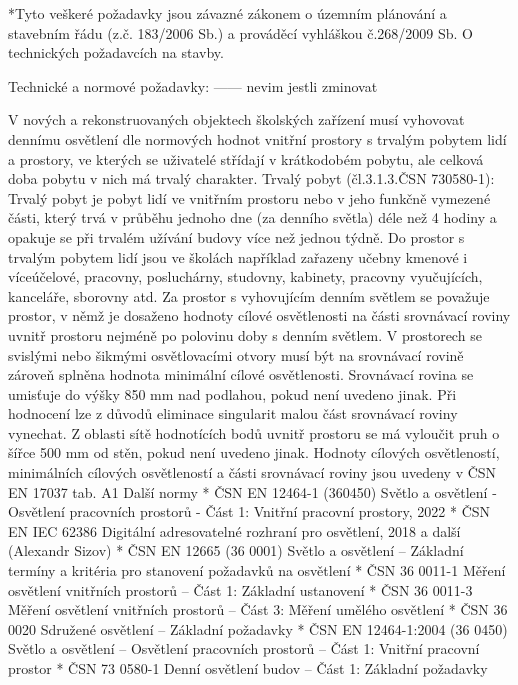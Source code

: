 *Tyto veškeré požadavky jsou závazné zákonem o územním plánování a stavebním řádu (z.č. 183/2006 Sb.) a prováděcí vyhláškou č.268/2009 Sb. O technických požadavcích na stavby.
\enditems

\secc Technické a normové požadavky:   ------ nevim jestli zminovat

V nových a rekonstruovaných objektech školských zařízení musí vyhovovat dennímu osvětlení dle normových hodnot vnitřní prostory s trvalým pobytem lidí a prostory, ve kterých se uživatelé střídají v krátkodobém pobytu, ale celková doba pobytu v nich má trvalý charakter.
Trvalý pobyt (čl.3.1.3.ČSN 730580-1):
\medskip
Trvalý pobyt je pobyt lidí ve vnitřním prostoru nebo v jeho funkčně vymezené části, který trvá v průběhu jednoho dne (za denního světla) déle než 4 hodiny a opakuje se při trvalém užívání budovy více než jednou týdně.
\medskip
Do prostor s trvalým pobytem lidí jsou ve školách například zařazeny učebny kmenové i víceúčelové, pracovny, posluchárny, studovny, kabinety, pracovny vyučujících, kanceláře, sborovny atd. Za prostor s vyhovujícím denním světlem se považuje prostor, v němž je dosaženo hodnoty cílové osvětlenosti na části srovnávací roviny uvnitř prostoru nejméně po polovinu doby s denním světlem.
\medskip
V prostorech se svislými nebo šikmými osvětlovacími otvory musí být na srovnávací rovině zároveň splněna hodnota minimální cílové osvětlenosti.
\medskip
Srovnávací rovina se umisťuje do výšky 850 mm nad podlahou, pokud není uvedeno jinak. Při hodnocení lze z důvodů eliminace singularit malou část srovnávací roviny vynechat. Z oblasti sítě hodnotících bodů uvnitř prostoru se má vyloučit pruh o šířce 500 mm od stěn, pokud není uvedeno jinak.
\medskip
Hodnoty cílových osvětleností, minimálních cílových osvětleností a části srovnávací roviny jsou uvedeny v ČSN EN 17037 tab. A1
\medskip
{\sbf Další normy}
\begitems
    * ČSN EN 12464-1 (360450) Světlo a osvětlení - Osvětlení pracovních prostorů - Část 1: Vnitřní pracovní prostory, 2022
    * ČSN EN IEC 62386 Digitální adresovatelné rozhraní pro osvětlení, 2018
      a další (Alexandr Sizov)
    * ČSN EN 12665 (36 0001) Světlo a osvětlení – Základní termíny a kritéria pro stanovení požadavků na osvětlení
    * ČSN 36 0011-1 Měření osvětlení vnitřních prostorů – Část 1: Základní ustanovení
    * ČSN 36 0011-3 Měření osvětlení vnitřních prostorů – Část 3: Měření umělého osvětlení
    * ČSN 36 0020 Sdružené osvětlení – Základní požadavky
    * ČSN EN 12464-1:2004 (36 0450) Světlo a osvětlení – Osvětlení pracovních prostorů – Část 1: Vnitřní pracovní prostor
    * ČSN 73 0580-1 Denní osvětlení budov – Část 1: Základní požadavky
\enditems

